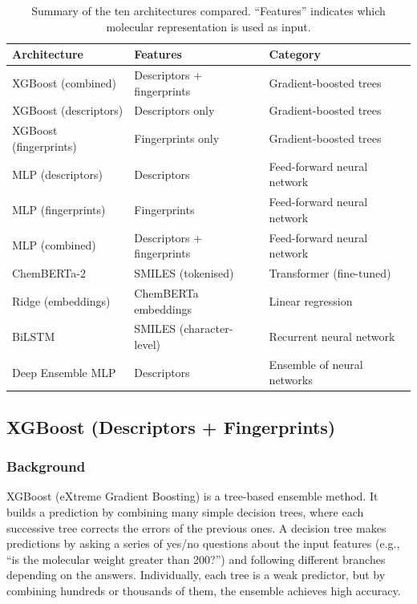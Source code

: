 \documentclass[11pt,a4paper]{article}
\begin{document}
\begin{table}[htbp]
\centering
\caption{Summary of the ten architectures compared. ``Features'' indicates which molecular representation is used as input.}
\label{tab:architectures}
\begin{tabular}{@{}lll@{}}
\toprule
\textbf{Architecture} & \textbf{Features} & \textbf{Category} \\
\midrule
XGBoost (combined) & Descriptors + fingerprints & Gradient-boosted trees \\
XGBoost (descriptors) & Descriptors only & Gradient-boosted trees \\
XGBoost (fingerprints) & Fingerprints only & Gradient-boosted trees \\
MLP (descriptors) & Descriptors & Feed-forward neural network \\
MLP (fingerprints) & Fingerprints & Feed-forward neural network \\
MLP (combined) & Descriptors + fingerprints & Feed-forward neural network \\
ChemBERTa-2 & SMILES (tokenised) & Transformer (fine-tuned) \\
Ridge (embeddings) & ChemBERTa embeddings & Linear regression \\
BiLSTM & SMILES (character-level) & Recurrent neural network \\
Deep Ensemble MLP & Descriptors & Ensemble of neural networks \\
\bottomrule
\end{tabular}
\end{table}

\subsection{XGBoost (Descriptors + Fingerprints)}

\subsubsection*{Background}

XGBoost (eXtreme Gradient Boosting) is a tree-based ensemble method. It builds a prediction by combining many simple decision trees, where each successive tree corrects the errors of the previous ones. A decision tree makes predictions by asking a series of yes/no questions about the input features (e.g., ``is the molecular weight greater than 200?'') and following different branches depending on the answers. Individually, each tree is a weak predictor, but by combining hundreds or thousands of them, the ensemble achieves high accuracy.
\end{document}
